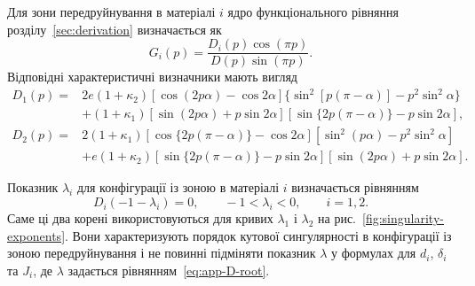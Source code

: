 Для зони передруйнування в матеріалі $i$ ядро функціонального рівняння
розділу~\ref{sec:derivation} визначається як
\begin{equation*}
  G_i(p)=\frac{D_i(p)\cos(\pi p)}{D(p)\sin(\pi p)}.
\end{equation*}
Відповідні характеристичні визначники мають вигляд
\begin{equation}
\label{eq:app-post-zone-determinants}
\begin{aligned}
  D_1(p)={}&2e(1+\kappa_2)
  [\cos(2p\alpha)-\cos2\alpha]
  \{\sin^2[p(\pi-\alpha)]-p^2\sin^2\alpha\}\\
  &+(1+\kappa_1)
  [\sin(2p\alpha)+p\sin2\alpha]
  [\sin\{2p(\pi-\alpha)\}-p\sin2\alpha],\\[3pt]
  D_2(p)={}&2(1+\kappa_1)
  [\cos\{2p(\pi-\alpha)\}-\cos2\alpha]
  [\sin^2(p\alpha)-p^2\sin^2\alpha]\\
  &+e(1+\kappa_2)
  [\sin\{2p(\pi-\alpha)\}-p\sin2\alpha]
  [\sin(2p\alpha)+p\sin2\alpha].
\end{aligned}
\end{equation}


Показник $\lambda_i$ для конфігурації із зоною в матеріалі $i$ визначається
рівнянням
\begin{equation}
\label{eq:app-post-zone-root}
  D_i(-1-\lambda_i)=0,
  \qquad -1<\lambda_i<0,
  \qquad i=1,2.
\end{equation}
Саме ці два корені використовуються для кривих $\lambda_1$ і $\lambda_2$
на рис.~\ref{fig:singularity-exponents}. Вони характеризують порядок
кутової сингулярності в конфігурації із зоною передруйнування і не повинні
підміняти показник $\lambda$ у формулах для $d_i$, $\delta_i$ та $J_i$,
де $\lambda$ задається рівнянням~\eqref{eq:app-D-root}.
